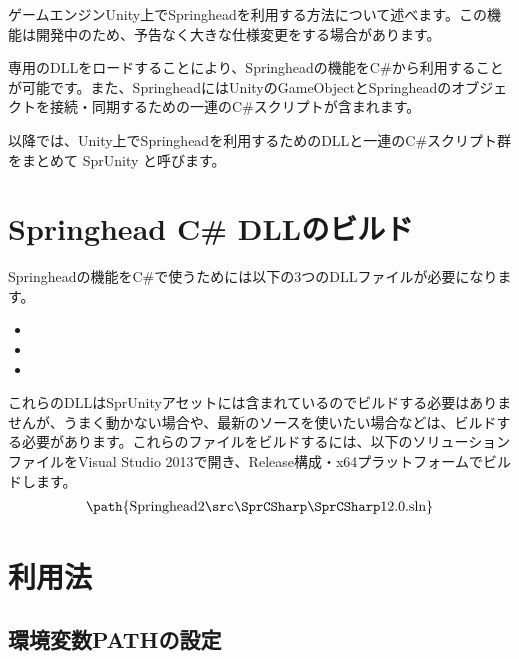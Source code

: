 \KLUDGE %
\KLUDGE %
\KLUDGE %
\KLUDGE %
\KLUDGE %
\KLUDGE %
\KLUDGE %

\begin{chapterabstract}
\KLUDGE ゲームエンジンUnity上でSpringheadを利用する方法について述べます。この機能は開発中のため、予告なく大きな仕様変更をする場合があります。

\KLUDGE 専用のDLLをロードすることにより、Springheadの機能をC\#から利用することが可能です。また、SpringheadにはUnityのGameObjectとSpringheadのオブジェクトを接続・同期するための一連のC\#スクリプトが含まれます。

\KLUDGE 以降では、Unity上でSpringheadを利用するためのDLLと一連のC\#スクリプト群をまとめて SprUnity と呼びます。
\end{chapterabstract}

\section{Springhead C\# DLLのビルド}

Springheadの機能をC\#で使うためには以下の3つのDLLファイルが必要になります。
\begin{itemize}
\item {}
\item {}
\item {}
\end{itemize}

\KLUDGE これらのDLLはSprUnityアセットには含まれているのでビルドする必要はありませんが、うまく動かない場合や、最新のソースを使いたい場合などは、ビルドする必要があります。これらのファイルをビルドするには、以下のソリューションファイルをVisual Studio 2013で開き、Release構成・x64プラットフォームでビルドします。
\begin{align*}
\text{\path{Springhead2\src\SprCSharp\SprCSharp12.0.sln}}
\end{align*}


\section{利用法}

\subsection{環境変数PATHの設定}

